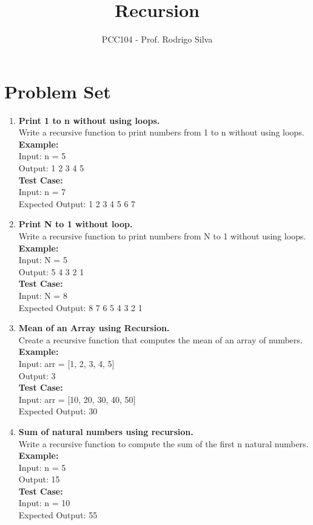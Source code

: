\documentclass[12pt]{article}
\title{Recursion}
\author{PCC104 - Prof. Rodrigo Silva}
\date{}
\begin{document}
\maketitle

\section*{Problem Set}

\begin{enumerate}

    \item \textbf{Print 1 to n without using loops.} \\
    Write a recursive function to print numbers from 1 to n without using loops. \\
    \textbf{Example:} \\
    Input: n = 5 \\
    Output: 1 2 3 4 5 \\
    \textbf{Test Case:} \\
    Input: n = 7 \\
    Expected Output: 1 2 3 4 5 6 7
    
    \item \textbf{Print N to 1 without loop.} \\
    Write a recursive function to print numbers from N to 1 without using loops. \\
    \textbf{Example:} \\
    Input: N = 5 \\
    Output: 5 4 3 2 1 \\
    \textbf{Test Case:} \\
    Input: N = 8 \\
    Expected Output: 8 7 6 5 4 3 2 1
    
    \item \textbf{Mean of an Array using Recursion.} \\
    Create a recursive function that computes the mean of an array of numbers. \\
    \textbf{Example:} \\
    Input: arr = [1, 2, 3, 4, 5] \\
    Output: 3 \\
    \textbf{Test Case:} \\
    Input: arr = [10, 20, 30, 40, 50] \\
    Expected Output: 30
    
    \item \textbf{Sum of natural numbers using recursion.} \\
    Write a recursive function to compute the sum of the first n natural numbers. \\
    \textbf{Example:} \\
    Input: n = 5 \\
    Output: 15 \\
    \textbf{Test Case:} \\
    Input: n = 10 \\
    Expected Output: 55
    

\end{enumerate}
\end{document}
